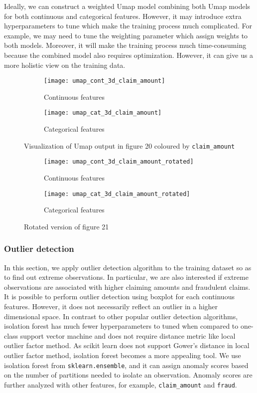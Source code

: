 \documentclass[12pt]{article}
\begin{document}
Ideally, we can construct a weighted Umap model combining both Umap models for both continuous and categorical features. However, it may introduce extra hyperparameters to tune which make the training process much complicated. For example, we may need to tune the weighting parameter which assign weights to both models. Moreover, it will make the training process much time-consuming because the combined model also requires optimization. However, it can give us a more holistic view on the training data.

\begin{figure}[h]
\centering
\begin{subfigure}{.5\textwidth}
  \centering
  \texttt{[image: umap\_cont\_3d\_claim\_amount]}
  \caption{Continuous features}
  \label{fig:sub1}
\end{subfigure}%
\begin{subfigure}{.5\textwidth}
  \centering
  \texttt{[image: umap\_cat\_3d\_claim\_amount]}
  \caption{Categorical features}
  \label{fig:sub2}
\end{subfigure}
\caption{Visualization of Umap output in figure 20 coloured by \texttt{claim\_amount}}

\begin{subfigure}{.5\textwidth}
  \centering
  \texttt{[image: umap\_cont\_3d\_claim\_amount\_rotated]}
  \caption{Continuous features}
  \label{fig:sub3}
\end{subfigure}%
\begin{subfigure}{.5\textwidth}
  \centering
  \texttt{[image: umap\_cat\_3d\_claim\_amount\_rotated]}
  \caption{Categorical features}
  \label{fig:sub4}
\end{subfigure}
\caption{Rotated version of figure 21}
\end{figure}

\subsubsection*{Outlier detection}

In this section, we apply outlier detection algorithm to the training dataset so as to find out extreme observations. In particular, we are also interested if extreme observations are associated with higher claiming amounts and fraudulent claims. It is possible to perform outlier detection using boxplot for each continuous features. However, it does not necessarily reflect an outlier in a higher dimensional space. In contrast to other popular outlier detection algorithms, isolation forest has much fewer hyperparameters to tuned when compared to one-class support vector machine and does not require distance metric like local outlier factor method. As scikit learn does not support Gower's distance in local outlier factor method, isolation forest becomes a more appealing tool. We use isolation forest from \texttt{sklearn.ensemble}, and it can assign anomaly scores based on the number of partitions needed to isolate an observation. Anomaly scores are further analyzed with other features, for example, \texttt{claim\_amount} and \texttt{fraud}. \\
\end{document}
